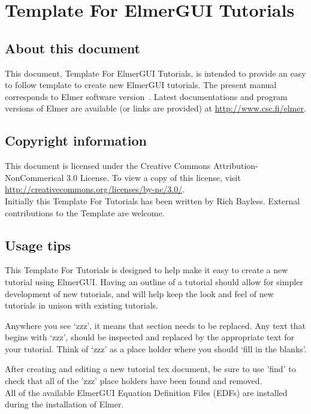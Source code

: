 \chapter*{Template For ElmerGUI Tutorials}

\section*{About this document}

This document, Template For ElmerGUI Tutorials, is intended to provide an easy to follow template to create new ElmerGUI tutorials.  The present manual corresponds to Elmer software version~\elmerversion{}.  Latest documentations and program versions of Elmer are available (or links are provided) at \url{http://www.csc.fi/elmer}. 

\section*{Copyright information}

This document is licensed under the Creative Commons Attribution-NonCommerical 3.0 License.  To view a copy of this license, visit \url{http://creativecommons.org/licenses/by-nc/3.0/}.\\

Initially this Template For Tutorials has been written by Rich Bayless.  External contributions to the Template are welcome.

\section*{Usage tips}

This Template For Tutorials is designed to help make it easy to create a new tutorial using ElmerGUI.  Having an outline of a tutorial should allow for simpler development of new tutorials, and will help keep the look and feel of new tutorials in unison with existing tutorials.

Anywhere you see `zzz', it means that section needs to be replaced.  Any text that begins with `zzz', should be inspected and replaced by the appropriate text for your tutorial.  Think of `zzz' as a place holder where you should `fill in the blanks'.

After creating and editing a new tutorial tex document, be sure to use 'find' to check that all of the 'zzz' place holders have been found and removed.\\

All of the available ElmerGUI Equation Definition Files (EDFs) are installed during the installation of Elmer.


